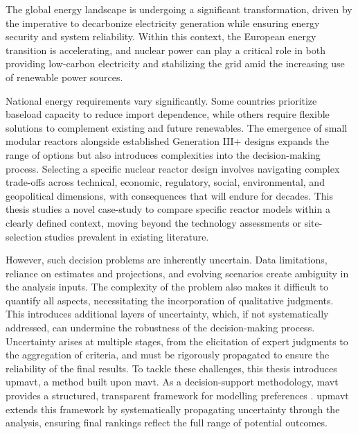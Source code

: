 The global energy landscape is undergoing a significant transformation, driven by the imperative to decarbonize electricity generation while ensuring energy security and system reliability. Within this context, the European energy transition is accelerating, and nuclear power can play a critical role in both providing low-carbon electricity and stabilizing the grid amid the increasing use of renewable power sources.

National energy requirements vary significantly. Some countries prioritize baseload capacity to reduce import dependence, while others require flexible solutions to complement existing and future renewables. The emergence of small modular reactors alongside established Generation III+ designs expands the range of options but also introduces complexities into the decision-making process. Selecting a specific nuclear reactor design involves navigating complex trade-offs across technical, economic, regulatory, social, environmental, and geopolitical dimensions, with consequences that will endure for decades. This thesis studies a novel case-study to compare specific reactor models within a clearly defined context, moving beyond the technology assessments or site-selection studies prevalent in existing literature.

However, such decision problems are inherently uncertain. Data limitations, reliance on estimates and projections, and evolving scenarios create ambiguity in the analysis inputs. The complexity of the problem also makes it difficult to quantify all aspects, necessitating the incorporation of qualitative judgments. This introduces additional layers of uncertainty, which, if not systematically addressed, can undermine the robustness of the decision-making process. Uncertainty arises at multiple stages, from the elicitation of expert judgments to the aggregation of criteria, and must be rigorously propagated to ensure the reliability of the final results. To tackle these challenges, this thesis introduces \gls{upmavt}, a method built upon \acrfull{mavt}. As a decision-support methodology, \gls{mavt} provides a structured, transparent framework for modelling preferences \cite{SCHUWIRTH2012472}. \gls{upmavt} extends this framework by systematically propagating uncertainty through the analysis, ensuring final rankings reflect the full range of potential outcomes.

